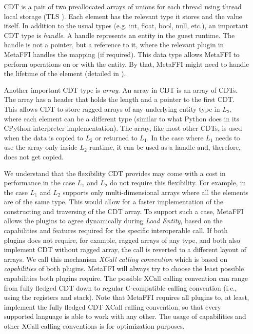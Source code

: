 \documentclass[sigplan,10pt,manuscript,nonacm]{acmart}
\begin{document}
CDT is a pair of two preallocated arrays of unions for each thread using thread local storage (TLS \cite{ThreadLocalStorage}). Each element has the relevant type it stores and the value itself. In addition to the usual types (e.g. int, float, bool, null, etc.), an important CDT type is \textit{handle}. A handle represents an entity in the guest runtime. The handle is not a pointer, but a reference to it, where the relevant plugin in MetaFFI handles the mapping (if required). This data type allows MetaFFI to perform operations on or with the entity. By that, MetaFFI might need to handle the lifetime of the element (detailed in \cite{metaffi_paper}).

Another important CDT type is \textit{array}. An array in CDT is an array of CDTs. The array has a header that holds the length and a pointer to the first CDT. This allows CDT to store ragged arrays of any underlying entity type in $L_2$, where each element can be a different type (similar to what Python does in its CPython interpreter implementation). The array, like most other CDTs, is used when the data is copied to $L_2$ or returned to $L_1$. In the case where $L_1$ needs to use the array only inside $L_2$ runtime, it can be used as a handle and, therefore, does not get copied. 

We understand that the flexibility CDT provides may come with a cost in performance in the case $L_1$ and $L_2$ do not require this flexibility. For example, in the case $L_1$ and $L_2$ supports only multi-dimensional arrays where all the elements are of the same type. This would allow for a faster implementation of the constructing and traversing of the CDT array. To support such a case, MetaFFI allows the plugins to agree dynamically during \textit{Load Entity}, based on the capabilities and features required for the specific interoperable call. If both plugins does not require, for example, ragged arrays of any type, and both also implement CDT without ragged array, the call is reverted to a different layout of arrays. We call this mechanism \textit{XCall calling convention} which is based on \textit{capabilities} of both plugins. MetaFFI will always try to choose the least possible capabilities both plugins require. The possible XCall calling convention can range from fully fledged CDT down to regular C-compatible calling convention (i.e., using the registers and stack). Note that MetaFFI requires all plugins to, at least, implement the fully fledged CDT XCall calling convention, so that every supported language is able to work with any other. The usage of capabilities and other XCall calling conventions is for optimization purposes.
\end{document}
